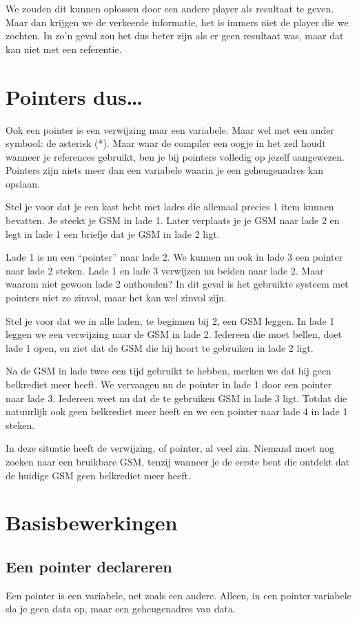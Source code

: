 We zouden dit kunnen oplossen door een andere player als resultaat te geven. Maar dan krijgen we de verkeerde informatie, het is immers niet de player die we zochten. In zo'n geval zou het dus beter zijn als er geen resultaat was, maar dat kan niet met een referentie.

\section{Pointers dus\ldots}
Ook een pointer is een verwijzing naar een variabele. Maar wel met een ander symbool: de asterisk (*). Maar waar de compiler een oogje in het zeil houdt wanneer je references gebruikt, ben je bij pointers volledig op jezelf aangewezen. Pointers zijn niets meer dan een variabele waarin je een geheugenadres kan opslaan.

Stel je voor dat je een kast hebt met lades die allemaal precies 1 item kunnen bevatten. Je steekt je GSM in lade 1. Later verplaats je je GSM naar lade 2 en legt in lade 1 een briefje dat je GSM in lade 2 ligt.

Lade 1 is nu een ``pointer'' naar lade 2. We kunnen nu ook in lade 3 een pointer naar lade 2 steken. Lade 1 en lade 3 verwijzen nu beiden naar lade 2. Maar waarom niet gewoon lade 2 onthouden? In dit geval is het gebruikte systeem met pointers niet zo zinvol, maar het kan wel zinvol zijn.

Stel je voor dat we in alle laden, te beginnen bij 2, een GSM leggen. In lade 1 leggen we een verwijzing naar de GSM in lade 2. Iedereen die moet bellen, doet lade 1 open, en ziet dat de GSM die hij hoort te gebruiken in lade 2 ligt.

Na de GSM in lade twee een tijd gebruikt te hebben, merken we dat hij geen belkrediet meer heeft. We vervangen nu de pointer in lade 1 door een pointer naar lade 3. Iedereen weet nu dat de te gebruiken GSM in lade 3 ligt. Totdat die natuurlijk ook geen belkrediet meer heeft en we een pointer naar lade 4 in lade 1 steken.

In deze situatie heeft de verwijzing, of pointer, al veel zin. Niemand moet nog zoeken naar een bruikbare GSM, tenzij wanneer je de eerste bent die ontdekt dat de huidige GSM geen belkrediet meer heeft.

\section{Basisbewerkingen}
\subsection{Een pointer declareren}
Een pointer is een variabele, net zoals een andere. Alleen, in een pointer variabele sla je geen data op, maar een geheugenadres van data. 

